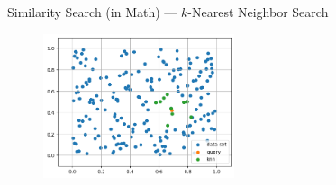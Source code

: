 \begin{frame}{Similarity Search (in Math) --- \(k\)-Nearest Neighbor Search}
    \begin{figure}[ht]
        \centering
        \includegraphics[width=0.5\textwidth]{images/sim-search-final.png}
    \end{figure}
\end{frame}

